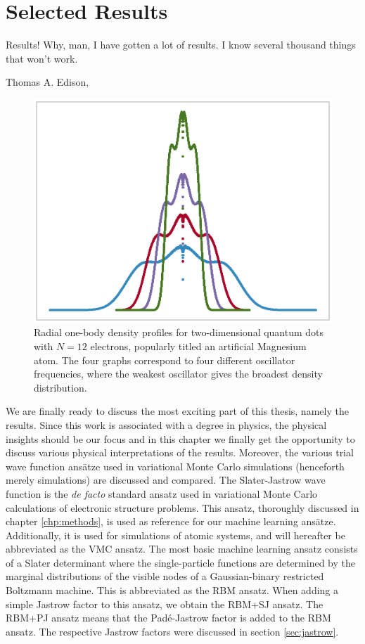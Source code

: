 \chapter{Selected Results} \label{chp:results}
\epigraph{Results! Why, man, I have gotten a lot of results. I know several thousand things that won't work.}{Thomas A. Edison, \supercite{noauthor_edisonian_nodate}}
\begin{figure}[H]
	\centering
	\includegraphics[scale=0.55]{../Images/art.eps}
	\caption{Radial one-body density profiles for two-dimensional quantum dots with $N=12$ electrons, popularly titled an artificial Magnesium atom. The four graphs correspond to four different oscillator frequencies, where the weakest oscillator gives the broadest density distribution.}
\end{figure}

We are finally ready to discuss the most exciting part of this thesis, namely the results. Since this work is associated with a degree in physics, the physical insights should be our focus and in this chapter we finally get the opportunity to discuss various physical interpretations of the results. Moreover, the various trial wave function ansätze used in variational Monte Carlo simulations (henceforth merely simulations) are discussed and compared. The Slater-Jastrow wave function is the \textit{de facto} standard ansatz used in variational Monte Carlo calculations of electronic structure problems. This ansatz, thoroughly discussed in chapter \ref{chp:methods}, is used as reference for our machine learning ansätze. Additionally, it is used for simulations of atomic systems, and will hereafter be abbreviated as the VMC ansatz. The most basic machine learning ansatz consists of a Slater determinant where the single-particle functions are determined by the marginal distributions of the visible nodes of a Gaussian-binary restricted Boltzmann machine. This is abbreviated as the RBM ansatz. When adding a simple Jastrow factor to this ansatz, we obtain the RBM+SJ ansatz. The RBM+PJ ansatz means that the Padé-Jastrow factor is added to the RBM ansatz. The respective Jastrow factors were discussed in section \ref{sec:jastrow}.


